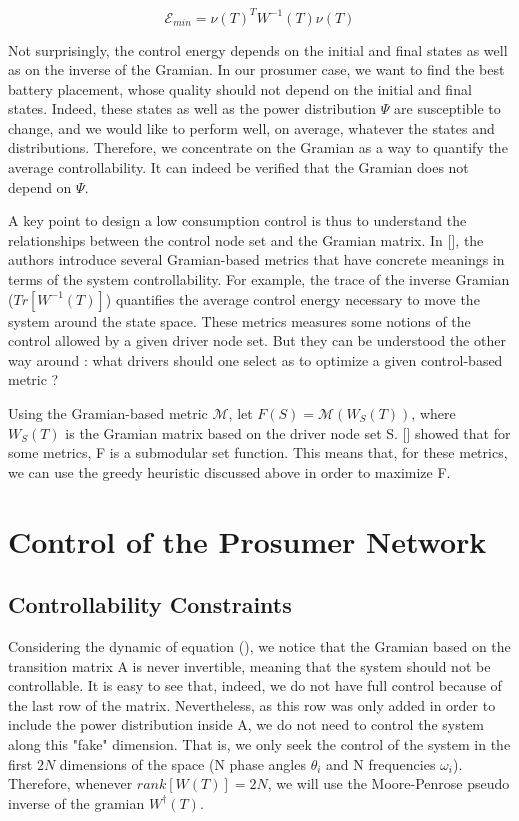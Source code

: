 \documentclass[10pt,twoside%
                ,draft%
        ]{article}
\begin{document}
\begin{equation}
 \mathcal{E}_{min} = \nu(T)^T W^{-1}(T) \nu(T)
\end{equation}

Not surprisingly, the control energy depends on the initial and final states as well as on the inverse of the Gramian. In our prosumer case, we want to find the best battery placement, whose quality should not depend on the initial and final states. Indeed, these states as well as  the power  distribution $ \Psi $ are susceptible to change, and we would like to perform well, on average, whatever the states and distributions. Therefore, we concentrate on  the Gramian as a way to quantify the average controllability. It can indeed be verified that the Gramian does not depend on $\Psi$.

A key point to design a low consumption control is thus to understand the relationships between the control node set and the Gramian matrix. In [], the authors introduce several Gramian-based metrics that have concrete meanings in terms of the system controllability. For example, the trace of the inverse Gramian ($ Tr[ W^{-1}(T)] $) quantifies the average control energy necessary to move the system around the state space. These metrics measures some notions of the control allowed by a given driver node set. But they can be understood the other way around : what drivers should one select as to optimize a given control-based metric ? 

Using the Gramian-based metric $ \mathcal{M} $, let $ F(S) =\mathcal{M}(W_S(T))$, where $ W_S(T) $  is the Gramian matrix based on the driver node set S. [] showed that for some metrics, F is a submodular set function. This means that, for these metrics, we can use the greedy heuristic discussed above in order to maximize F.

\section{Control of the Prosumer Network}

\subsection{Controllability Constraints}

 Considering the dynamic of equation (), we notice that the Gramian based on the transition matrix A is never invertible, meaning that the system should not be controllable. It is easy to see that, indeed, we do not have full control because of the last row of the matrix. Nevertheless, as this row was only added in order to include the power distribution inside A, we do not need to control the system along this "fake" dimension. That is, we only seek the control of the system in the first $ 2N $ dimensions of the space (N phase angles $ \theta_i$ and N frequencies $\omega_i$). Therefore, whenever $ rank[ W(T) ] = 2N$, we will use the Moore-Penrose pseudo inverse of the gramian $ W^\dagger(T) $.
\end{document}
